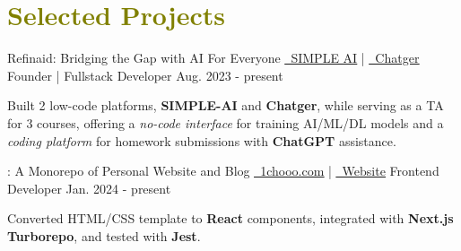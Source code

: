 
\section{\textcolor{olive}{\textbf{Selected Projects}}}
    \resumeSubHeadingListStart

    \resumeSubheading
            {Refinaid: Bridging the Gap with AI For Everyone}
            {
                \href{https://github.com/1chooo/simple-ai}{\underline{\faGithub\ SIMPLE AI}} 
                |
                \href{https://github.com/1chooo/chatger}{\underline{\faGithub\ Chatger}} 
            }
            {Founder | Fullstack Developer}
            {Aug. 2023 - present}

        \vspace{-1.0mm}

        \resumeItemListStart
            \item {Built 2 low-code platforms, \textbf{SIMPLE-AI} and \textbf{Chatger}, while serving as a TA for 3 courses, offering a \textit{no-code interface} for training AI/ML/DL models and a \textit{coding platform} for homework submissions with \textbf{ChatGPT} assistance.}
        \resumeItemListEnd

    \vspace{-2.0mm}

    \resumeSubheading
        {: A Monorepo of Personal Website and Blog} 
        {
        \href{https://github.com/1chooo/1chooo.com}{\underline{\faGithub\ 1chooo.com}} 
        |
        \href{https://1chooo.com}{\underline{\faDesktop\ Website}} 
        } %
        {Frontend Developer} %
        {Jan. 2024 - present} %
        
        \vspace{-1.0mm}
        
        \resumeItemListStart
            \item {Converted HTML/CSS template to \textbf{React} components, integrated with \textbf{Next.js Turborepo}, and tested with \textbf{Jest}.}
        \resumeItemListEnd

    \vspace{-2.0mm}
    

